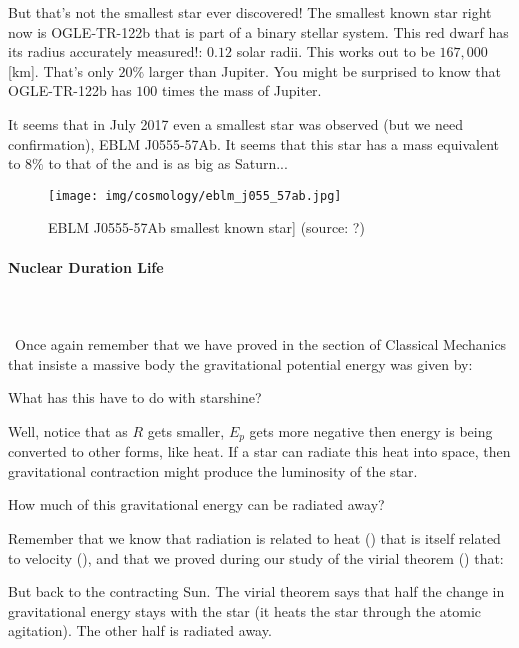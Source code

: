 	But that's not the smallest star ever discovered! The smallest known star right now is OGLE-TR-122b that is part of a binary stellar system. This red dwarf has its radius accurately measured!: $0.12$ solar radii. This works out to be $167,000$ [km]. That's only $20\%$ larger than Jupiter. You might be surprised to know that OGLE-TR-122b has $100$ times the mass of Jupiter.
	
	It seems that in July 2017 even a smallest star was observed (but we need confirmation), EBLM J0555-57Ab. It seems that this star has a mass equivalent to $8\%$ to that of the and is as big as Saturn...
	\begin{figure}[H]
		\begin{center}
		\texttt{[image: img/cosmology/eblm\_j055\_57ab.jpg]}
		\end{center}	
		\caption[EBLM J0555-57Ab smallest known star]{EBLM J0555-57Ab smallest known star] (source: ?)}
	\end{figure}
	
	\paragraph{Nuclear Duration Life}\mbox{}\\\\\
	Once again remember that we have proved in the section of Classical Mechanics that insiste a massive body the gravitational potential energy was given by:
	
	What has this have to do with starshine?

	Well, notice that as $R$ gets smaller, $E_p$ gets more negative then energy is being converted to other forms, like heat. If a star can radiate this heat into space, then gravitational contraction might produce the luminosity of the star.
	
	How much of this gravitational energy can be radiated away? 
	
	Remember that we know that radiation is related to heat () that is itself related to velocity (), and that we proved during our study of the virial theorem () that:
	 
	But back to the contracting Sun. The virial theorem says that half the change in gravitational energy stays with the star (it heats the star through the atomic agitation). The other half is radiated away.
	
